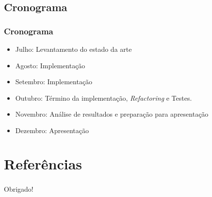 \documentclass{beamer}
\begin{document}
\subsection{Cronograma}
\begin{frame}
    \frametitle{Cronograma}
    \begin{itemize}
        \item Julho: Levantamento do estado da arte
        \item Agosto: Implementação
        \item Setembro: Implementação
        \item Outubro: Término da implementação, \textit{Refactoring} e Testes.
        \item Novembro: Análise de resultados e preparação para apresentação
        \item Dezembro: Apresentação
    \end{itemize}
\end{frame}



\nocite{Stevenson09,Cordeiro04,Cormen94,Kurose2005,Stevens94,Tanenbaum03,Zimmermann80,Bae09,Jung08,Park97}

\section{Referências}


\begin{frame}
    \frametitle{ }
    \centerline{Obrigado!}
\end{frame}
\end{document}
